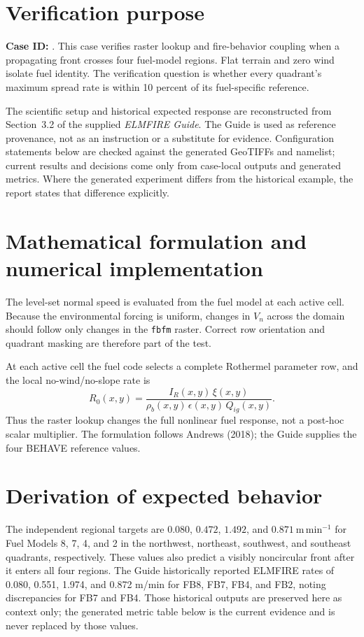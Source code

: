 \section{Verification purpose}

\textbf{Case ID:} \texttt{\CaseID}. This case verifies raster lookup and fire-behavior coupling when a propagating front crosses four fuel-model regions.  Flat terrain and zero wind isolate fuel identity.  The verification question is whether every quadrant's maximum spread rate is within 10 percent of its fuel-specific reference.

The scientific setup and historical expected response are reconstructed from Section~3.2 of the supplied \emph{ELMFIRE Guide}. The Guide is used as reference provenance, not as an instruction or a substitute for evidence. Configuration statements below are checked against the generated GeoTIFFs and namelist; current results and decisions come only from case-local outputs and generated metrics. Where the generated experiment differs from the historical example, the report states that difference explicitly.

\section{Mathematical formulation and numerical implementation}

The level-set normal speed is evaluated from the fuel model at each active cell.  Because the environmental forcing is uniform, changes in \(V_n\) across the domain should follow only changes in the \texttt{fbfm} raster.  Correct row orientation and quadrant masking are therefore part of the test.

At each active cell the fuel code selects a complete Rothermel parameter row, and the local no-wind/no-slope rate is
\begin{equation}
R_0(x,y)=\frac{I_R(x,y)\,\xi(x,y)}{\rho_b(x,y)\,\epsilon(x,y)\,Q_{ig}(x,y)}.
\end{equation}
Thus the raster lookup changes the full nonlinear fuel response, not a post-hoc scalar multiplier. The formulation follows Andrews (2018); the Guide supplies the four BEHAVE reference values.

\section{Derivation of expected behavior}

The independent regional targets are \(0.080\), \(0.472\), \(1.492\), and \(0.871~\mathrm{m\,min^{-1}}\) for Fuel Models 8, 7, 4, and 2 in the northwest, northeast, southwest, and southeast quadrants, respectively.  These values also predict a visibly noncircular front after it enters all four regions. The Guide historically reported ELMFIRE rates of 0.080, 0.551, 1.974, and 0.872 m/min for FB8, FB7, FB4, and FB2, noting discrepancies for FB7 and FB4. Those historical outputs are preserved here as context only; the generated metric table below is the current evidence and is never replaced by those values.

